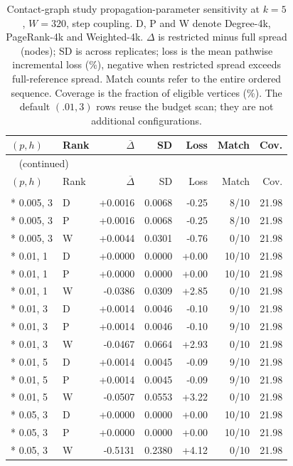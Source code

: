 \begin{longtable}{llrrrrr}
\caption{Contact-graph study propagation-parameter sensitivity at $k=5$, $W=320$, step coupling. D, P and W denote Degree-4k, PageRank-4k and Weighted-4k. $\Delta$ is restricted minus full spread (nodes); SD is across replicates; loss is the mean pathwise incremental loss (\%), negative when restricted spread exceeds full-reference spread. Match counts refer to the entire ordered sequence. Coverage is the fraction of eligible vertices (\%). The default $(.01,3)$ rows reuse the budget scan; they are not additional configurations.}\label{tab:hist-parameters}\\
\toprule
$(p,h)$ & Rank & $\overline\Delta$ & SD & Loss & Match & Cov. \\
\midrule
\endfirsthead
\multicolumn{7}{l}{\tablename~\thetable{} (continued)}\\
\toprule
$(p,h)$ & Rank & $\overline\Delta$ & SD & Loss & Match & Cov. \\
\midrule
\endhead
\bottomrule
\endfoot
\multicolumn{7}{l}{\textit{invs2013}}\\*
0.005, 3 & D & +0.0016 & 0.0068 & -0.25 & 8/10 & 21.98\\*
0.005, 3 & P & +0.0016 & 0.0068 & -0.25 & 8/10 & 21.98\\*
0.005, 3 & W & +0.0044 & 0.0301 & -0.76 & 0/10 & 21.98\\*
0.01, 1 & D & +0.0000 & 0.0000 & +0.00 & 10/10 & 21.98\\*
0.01, 1 & P & +0.0000 & 0.0000 & +0.00 & 10/10 & 21.98\\*
0.01, 1 & W & -0.0386 & 0.0309 & +2.85 & 0/10 & 21.98\\*
0.01, 3 & D & +0.0014 & 0.0046 & -0.10 & 9/10 & 21.98\\*
0.01, 3 & P & +0.0014 & 0.0046 & -0.10 & 9/10 & 21.98\\*
0.01, 3 & W & -0.0467 & 0.0664 & +2.93 & 0/10 & 21.98\\*
0.01, 5 & D & +0.0014 & 0.0045 & -0.09 & 9/10 & 21.98\\*
0.01, 5 & P & +0.0014 & 0.0045 & -0.09 & 9/10 & 21.98\\*
0.01, 5 & W & -0.0507 & 0.0553 & +3.22 & 0/10 & 21.98\\*
0.05, 3 & D & +0.0000 & 0.0000 & +0.00 & 10/10 & 21.98\\*
0.05, 3 & P & +0.0000 & 0.0000 & +0.00 & 10/10 & 21.98\\*
0.05, 3 & W & -0.5131 & 0.2380 & +4.12 & 0/10 & 21.98\\

\end{longtable}
